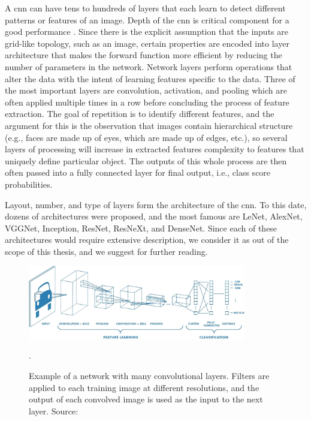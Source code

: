         A \gls{cnn} can have tens to hundreds of layers that each learn to detect different patterns or features of an image. Depth of the \gls{cnn} is critical component for a good performance \cite{russakovsky2015imagenet}. Since there is the explicit assumption that the inputs are grid-like topology, such as an image, certain properties are encoded into layer architecture that makes the forward function more efficient by reducing the number of parameters in the network. Network layers perform operations that alter the data with the intent of learning features specific to the data. Three of the most important layers are convolution, activation, and pooling which are often applied multiple times in a row before concluding the process of feature extraction. The goal of repetition is to identify different features, and the argument for this is the observation that images contain hierarchical structure (e.g., faces are made up of eyes, which are made up of edges, etc.), so several layers of processing will increase in extracted features complexity to features that uniquely define particular object. The outputs of this whole process are then often passed into a fully connected layer for final output, i.e., class score probabilities. 
        
        Layout, number, and type of layers form the architecture of the \gls{cnn}. To this date, dozens of architectures were proposed, and the most famous are LeNet, AlexNet, VGGNet, Inception, ResNet, ResNeXt, and DenseNet. Since each of these architectures would require extensive description, we consider it as out of the scope of this thesis, and we suggest \cite{cs231n, dascnnoverview, jordancnnoverview} for further reading. 

        \begin{figure}[ht]
            \centering
            \includegraphics[width=0.85\textwidth]{resources/convolutional-neural-network.png}
            \caption{Example of a network with many convolutional layers. Filters are applied to each training image at different resolutions, and the output of each convolved image is used as the input to the next layer. Source: \cite{mathworkscnn}}.
            \label{fig:convolutional neural netwok}
        \end{figure}
        
